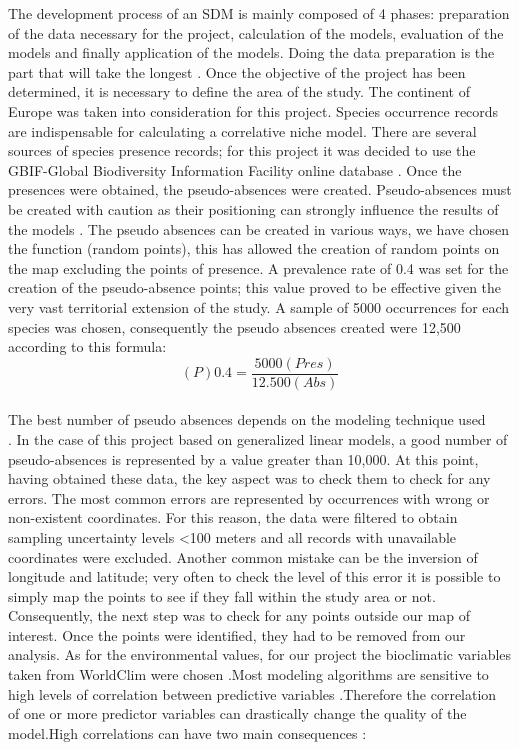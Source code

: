 \documentclass[12pt,a4paper]{article}
\begin{document}
The development process of an SDM is mainly composed of 4 phases: preparation of the data necessary for the project, calculation of the models, evaluation of the models and finally application of the models. Doing the data preparation is the part that will take the longest \citep{sil}.
Once the objective of the project has been determined, it is necessary to define the area of the study.
The continent of Europe was taken into consideration for this project.
Species occurrence records are indispensable for calculating a correlative niche model. There are several sources of species presence records; for this project it was decided to use the GBIF-Global Biodiversity Information Facility online database \citep{yes}.
Once the presences were obtained, the pseudo-absences were created.
Pseudo-absences must be created with caution as their positioning can strongly influence the results of the models \citep{mass}.
The pseudo absences can be created in various ways, we have chosen the function (random points), this has allowed the creation of random points on the map excluding the points of presence.
A prevalence rate of 0.4 was set for the creation of the pseudo-absence points; this value proved to be effective given the very vast territorial extension of the study.
A sample of 5000 occurrences for each species was chosen, consequently the pseudo absences created were 12,500 according to this formula:\\ \[(P)0.4=\frac{5000(Pres)}{12.500 (Abs)}\] \\
The best number of pseudo absences depends on the modeling technique used\\ \citep{kan} \citep{mass} .
In the case of this project based on generalized linear models, a good number of pseudo-absences is represented by a value greater than 10,000.
At this point, having obtained these data, the key aspect was to check them to check for any errors.
The most common errors are represented by occurrences with wrong or non-existent coordinates.
For this reason, the data were filtered to obtain sampling uncertainty levels <100 meters and all records with unavailable coordinates were excluded.
Another common mistake can be the inversion of longitude and latitude;
very often to check the level of this error it is possible to simply map the points to see if they fall within the study area or not.
Consequently, the next step was to check for any points outside our map of interest.
Once the points were identified, they had to be removed from our analysis.
As for the environmental values, for our project the bioclimatic variables taken from WorldClim were chosen \citep{bcw}.Most modeling algorithms are sensitive to high levels of correlation between predictive variables \citep{dor13}.Therefore the correlation of one or more predictor variables can drastically change the quality of the model.High correlations can have two main consequences \citep{dor13}\citep{demn}:
\end{document}
